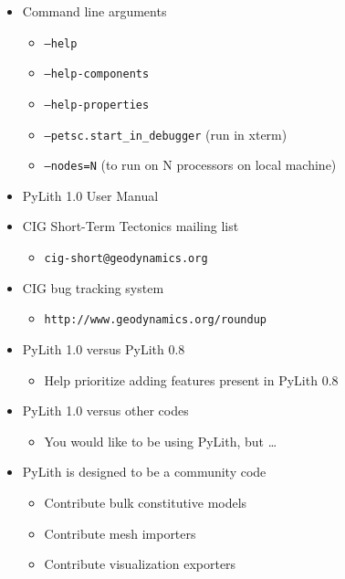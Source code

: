 \documentclass[pdftex,cig,slideColor]{pp4slides}
\begin{document}
  \begin{itemize}
  \item Command line arguments
    \begin{itemize}
    \item {\tt --help}
    \item {\tt --help-components}
    \item {\tt --help-properties}
    \item {\tt --petsc.start\_in\_debugger} (run in xterm)
    \item {\tt --nodes=N} (to run on N processors on local machine)
    \end{itemize}
  \item PyLith 1.0 User Manual
  \item CIG Short-Term Tectonics mailing list
    \begin{itemize}
    \item {\tt cig-short@geodynamics.org}
    \end{itemize}
  \item CIG bug tracking system
    \begin{itemize}
    \item {\tt http://www.geodynamics.org/roundup}
    \end{itemize}
  \end{itemize}


  \begin{itemize}
  \item PyLith 1.0 versus PyLith 0.8
    \begin{itemize}
    \item Help prioritize adding features present in PyLith 0.8
    \end{itemize}
  \item PyLith 1.0 versus other codes
    \begin{itemize}
    \item You would like to be using PyLith, but \ldots
    \end{itemize}
  \item PyLith is designed to be a community code
    \begin{itemize}
    \item Contribute bulk constitutive models
    \item Contribute mesh importers
    \item Contribute visualization exporters
    \end{itemize}
  \end{itemize}


\end{document}
